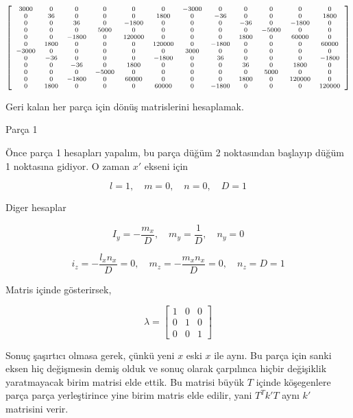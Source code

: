 \documentclass[12pt,fleqn]{article}\usepackage{../../common}
\begin{document}
$$
{\scriptsize
\left[\begin{array}{cccccccccccc}3000 & 0 & 0 & 0 & 0 & 0 & -3000 & 0 & 0 & 0 & 0 & 0\\0 & 36 & 0 & 0 & 0 & 1800 & 0 & -36 & 0 & 0 & 0 & 1800\\0 & 0 & 36 & 0 & -1800 & 0 & 0 & 0 & -36 & 0 & -1800 & 0\\0 & 0 & 0 & 5000 & 0 & 0 & 0 & 0 & 0 & -5000 & 0 & 0\\0 & 0 & -1800 & 0 & 120000 & 0 & 0 & 0 & 1800 & 0 & 60000 & 0\\0 & 1800 & 0 & 0 & 0 & 120000 & 0 & -1800 & 0 & 0 & 0 & 60000\\-3000 & 0 & 0 & 0 & 0 & 0 & 3000 & 0 & 0 & 0 & 0 & 0\\0 & -36 & 0 & 0 & 0 & -1800 & 0 & 36 & 0 & 0 & 0 & -1800\\0 & 0 & -36 & 0 & 1800 & 0 & 0 & 0 & 36 & 0 & 1800 & 0\\0 & 0 & 0 & -5000 & 0 & 0 & 0 & 0 & 0 & 5000 & 0 & 0\\0 & 0 & -1800 & 0 & 60000 & 0 & 0 & 0 & 1800 & 0 & 120000 & 0\\0 & 1800 & 0 & 0 & 0 & 60000 & 0 & -1800 & 0 & 0 & 0 & 120000\end{array}\right]
}
$$

Geri kalan her parça için dönüş matrislerini hesaplamak.

Parça 1

Önce parça 1 hesapları yapalım, bu parça düğüm 2 noktasından başlayıp
düğüm 1 noktasına gidiyor. O zaman $x'$ ekseni için

$$
l = 1, \quad m = 0, \quad n = 0, \quad D = 1
$$

Diger hesaplar

$$
I_y = -\frac{m_x}{D}, \quad
m_y = \frac{1}{D}, \quad
n_y = 0
$$

$$
i_z = -\frac{l_x n_x}{D} = 0, \quad
m_z = -\frac{m_x n_x}{D} = 0, \quad
n_z = D = 1
$$

Matris içinde gösterirsek,

$$
\lambda = \left[\begin{array}{ccc}
1 & 0 & 0 \\ 0 & 1 & 0 \\ 0 & 0 & 1
\end{array}\right]
$$

Sonuç şaşırtıcı olmasa gerek, çünkü yeni $x$ eski $x$ ile aynı. Bu parça için
sanki eksen hiç değişmesin demiş olduk ve sonuç olarak çarpılınca hiçbir
değişiklik yaratmayacak birim matrisi elde ettik. Bu matrisi büyük $T$ içinde
köşegenlere parça parça yerleştirince yine birim matris elde edilir, yani
$T^T k'T$ aynı $k'$ matrisini verir.
\end{document}
